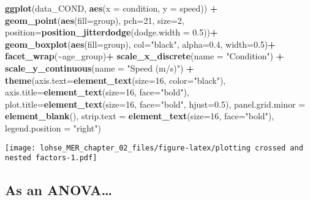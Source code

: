 \documentclass[]{article}
\newenvironment{Shaded}{\begin{snugshade}}{\end{snugshade}}
\newcommand{\DataTypeTok}[1]{\textcolor[rgb]{0.13,0.29,0.53}{#1}}
\newcommand{\DecValTok}[1]{\textcolor[rgb]{0.00,0.00,0.81}{#1}}
\newcommand{\FloatTok}[1]{\textcolor[rgb]{0.00,0.00,0.81}{#1}}
\newcommand{\KeywordTok}[1]{\textcolor[rgb]{0.13,0.29,0.53}{\textbf{#1}}}
\newcommand{\NormalTok}[1]{#1}
\newcommand{\OperatorTok}[1]{\textcolor[rgb]{0.81,0.36,0.00}{\textbf{#1}}}
\newcommand{\StringTok}[1]{\textcolor[rgb]{0.31,0.60,0.02}{#1}}
\begin{document}
\begin{Shaded}
\begin{Highlighting}[]
\KeywordTok{ggplot}\NormalTok{(data\_COND, }\KeywordTok{aes}\NormalTok{(}\DataTypeTok{x =}\NormalTok{ condition, }\DataTypeTok{y =}\NormalTok{ speed)) }\OperatorTok{+}
\StringTok{  }\KeywordTok{geom\_point}\NormalTok{(}\KeywordTok{aes}\NormalTok{(}\DataTypeTok{fill=}\NormalTok{group), }\DataTypeTok{pch=}\DecValTok{21}\NormalTok{, }\DataTypeTok{size=}\DecValTok{2}\NormalTok{,}
             \DataTypeTok{position=}\KeywordTok{position\_jitterdodge}\NormalTok{(}\DataTypeTok{dodge.width =} \FloatTok{0.5}\NormalTok{))}\OperatorTok{+}
\StringTok{  }\KeywordTok{geom\_boxplot}\NormalTok{(}\KeywordTok{aes}\NormalTok{(}\DataTypeTok{fill=}\NormalTok{group), }\DataTypeTok{col=}\StringTok{"black"}\NormalTok{,}
               \DataTypeTok{alpha=}\FloatTok{0.4}\NormalTok{, }\DataTypeTok{width=}\FloatTok{0.5}\NormalTok{)}\OperatorTok{+}
\StringTok{  }\KeywordTok{facet\_wrap}\NormalTok{(}\OperatorTok{\textasciitilde{}}\NormalTok{age\_group)}\OperatorTok{+}
\StringTok{  }\KeywordTok{scale\_x\_discrete}\NormalTok{(}\DataTypeTok{name =} \StringTok{"Condition"}\NormalTok{) }\OperatorTok{+}
\StringTok{  }\KeywordTok{scale\_y\_continuous}\NormalTok{(}\DataTypeTok{name =} \StringTok{"Speed (m/s)"}\NormalTok{) }\OperatorTok{+}
\StringTok{  }\KeywordTok{theme}\NormalTok{(}\DataTypeTok{axis.text=}\KeywordTok{element\_text}\NormalTok{(}\DataTypeTok{size=}\DecValTok{16}\NormalTok{, }\DataTypeTok{color=}\StringTok{"black"}\NormalTok{), }
        \DataTypeTok{axis.title=}\KeywordTok{element\_text}\NormalTok{(}\DataTypeTok{size=}\DecValTok{16}\NormalTok{, }\DataTypeTok{face=}\StringTok{"bold"}\NormalTok{),}
        \DataTypeTok{plot.title=}\KeywordTok{element\_text}\NormalTok{(}\DataTypeTok{size=}\DecValTok{16}\NormalTok{, }\DataTypeTok{face=}\StringTok{"bold"}\NormalTok{, }\DataTypeTok{hjust=}\FloatTok{0.5}\NormalTok{),}
        \DataTypeTok{panel.grid.minor =} \KeywordTok{element\_blank}\NormalTok{(),}
        \DataTypeTok{strip.text =} \KeywordTok{element\_text}\NormalTok{(}\DataTypeTok{size=}\DecValTok{16}\NormalTok{, }\DataTypeTok{face=}\StringTok{"bold"}\NormalTok{),}
        \DataTypeTok{legend.position =} \StringTok{"right"}\NormalTok{)}
\end{Highlighting}
\end{Shaded}

\texttt{[image: lohse\_MER\_chapter\_02\_files/figure-latex/plotting crossed and nested factors-1.pdf]}

\hypertarget{as-an-anova-2}{%
\subsection{As an ANOVA\ldots{}}\label{as-an-anova-2}}
\end{document}
